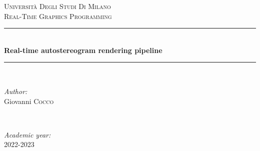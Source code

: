 \documentclass[12pt, a4paper]{article}
\begin{document}
\begin{titlepage}

    \newcommand{\HRule}{\rule{\linewidth}{0.5mm}} %
    
    \center %
     
    
    \textsc{\LARGE Università Degli Studi Di Milano}\\[1.5cm] %
    \textsc{\Large Real-Time Graphics Programming}\\[0.5cm] %
    
    
    \HRule \\[0.4cm]
    { \huge \bfseries Real-time autostereogram rendering pipeline }\\[0.4cm] %
    \HRule \\[1.5cm]
     
    
    \begin{minipage}{0.4\textwidth}
    \begin{flushleft} \large
    \emph{Author:}\\
    Giovanni \textsc{Cocco} \\
    \end{flushleft}
    \end{minipage}
    ~
    \begin{minipage}{0.4\textwidth}
    \begin{flushright} \large
    \emph{Academic year:} \\
    2022-2023\\
    \end{flushright}
    \end{minipage}\\[2cm]
    

\end{titlepage}
\end{document}
